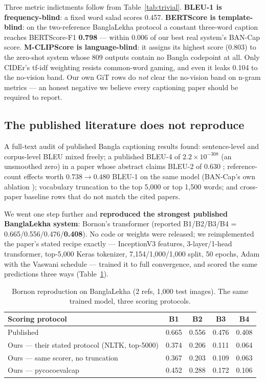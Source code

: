 \documentclass[11pt]{article}
\begin{document}
Three metric indictments follow from Table~\ref{tab:trivial}.
\textbf{BLEU-1 is frequency-blind}: a fixed word salad scores 0.457.
\textbf{BERTScore is template-blind}: on the two-reference BanglaLekha
protocol a constant three-word caption reaches BERTScore-F1
\textbf{0.798} --- within 0.006 of our best real system's BAN-Cap
score. \textbf{M-CLIPScore is language-blind}: it assigns its highest
score (0.803) to the zero-shot system whose 809 outputs contain no
Bangla codepoint at all. Only CIDEr's tf-idf weighting resists
common-word gaming, and even it leaks 0.104 to the no-vision band. Our
own GiT rows do \emph{not} clear the no-vision band on n-gram metrics
--- an honest negative we believe every captioning paper should be
required to report.

\subsection{The published literature does not reproduce}

A full-text audit of published Bangla captioning results found:
sentence-level and corpus-level BLEU mixed freely; a published BLEU-4
of $2.2\times10^{-308}$ (an unsmoothed zero) in a paper whose abstract
claims BLEU-2 of 0.630 \cite{palash2021}; reference-count effects worth
$0.738 \to 0.480$ BLEU-1 on the same model (BAN-Cap's own ablation
\cite{bancap2022}); vocabulary truncation to the top 5{,}000
\cite{bornon2021} or top 1{,}500 words; and cross-paper baseline rows
that do not match the cited papers.

We went one step further and \textbf{reproduced the strongest
published BanglaLekha system}: Bornon's transformer \cite{bornon2021}
(reported B1/B2/B3/B4 = 0.665/0.556/0.476/\textbf{0.408}). No code or
weights were released; we reimplemented the paper's stated recipe
exactly --- InceptionV3 features, 3-layer/1-head transformer, top-5{,}000
Keras tokenizer, 7{,}154/1{,}000/1{,}000 split, 50 epochs, Adam with
the Vaswani schedule --- trained it to full convergence, and scored the
same predictions three ways (Table~\ref{tab:bornon}).

\begin{table}[t]
\centering
\caption{Bornon reproduction on BanglaLekha (2 refs, 1{,}000 test
images). The same trained model, three scoring protocols.}
\label{tab:bornon}
\small
\begin{tabular}{lcccc}
\toprule
Scoring protocol & B1 & B2 & B3 & B4 \\
\midrule
Published \cite{bornon2021} & 0.665 & 0.556 & 0.476 & 0.408 \\
Ours --- their stated protocol (NLTK, top-5000) & 0.374 & 0.206 & 0.111 & 0.064 \\
Ours --- same scorer, no truncation & 0.367 & 0.203 & 0.109 & 0.063 \\
Ours --- pycocoevalcap & 0.452 & 0.288 & 0.172 & 0.106 \\
\bottomrule
\end{tabular}
\end{table}
\end{document}
